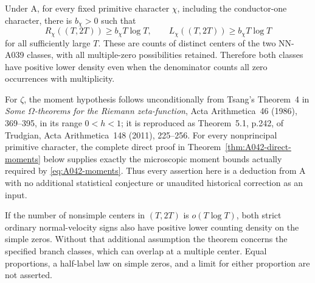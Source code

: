 \begin{theorem}
\label{thm:A042-positive-proportions}
Under A, for every fixed primitive character $\chi$, including
the conductor-one character, there is $b_\chi>0$ such that
\begin{equation}\label{eq:A042-density}
 R_\chi((T,2T))\ge b_\chi T\log T,
 \qquad L_\chi((T,2T))\ge b_\chi T\log T
\end{equation}
for all sufficiently large $T$. These are counts of distinct
centers of the two NN-A039 classes, with all multiple-zero
possibilities retained. Therefore both classes have positive
lower density even when the denominator counts all zero
occurrences with multiplicity.

For $\zeta$, the moment hypothesis follows unconditionally from
Tsang's Theorem~4 in \emph{Some $\Omega$-theorems for the Riemann
zeta-function}, Acta Arithmetica~46 (1986), 369--395, in its
range $0<h<1$; it is reproduced as Theorem~5.1, p.242, of
Trudgian, Acta Arithmetica~148 (2011), 225--256.
For every nonprincipal primitive character, the complete direct
proof in Theorem~\ref{thm:A042-direct-moments} below supplies
exactly the microscopic moment bounds actually required by
\eqref{eq:A042-moments}. Thus every assertion here is a deduction
from A with no additional statistical conjecture or unaudited
historical correction as an input.

If the number of nonsimple centers in $(T,2T)$ is
$o(T\log T)$, both strict ordinary normal-velocity signs also
have positive lower counting density on the simple zeros.
Without that additional assumption the theorem concerns the
specified branch classes, which can overlap at a multiple
center. Equal proportions, a half-label law on simple zeros,
and a limit for either proportion are not asserted.
\end{theorem}

